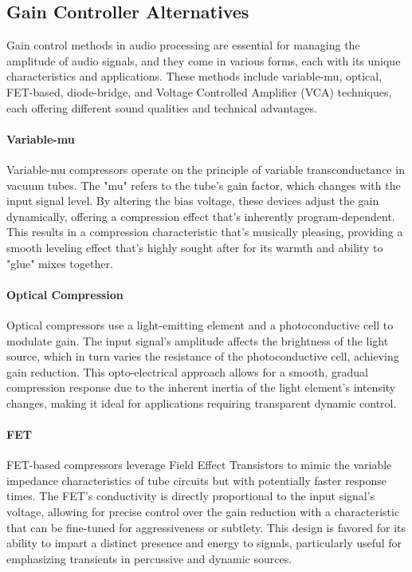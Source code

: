 \documentclass[10pt]{article}
\begin{document}
\begin{multicols*}{2}
            \subsection{Gain Controller Alternatives}\label{sect:vca}
                Gain control methods in audio processing are essential for managing the amplitude of audio signals, and they come in various forms, each with its unique characteristics and applications. These methods include variable-mu, optical, FET-based, diode-bridge, and Voltage Controlled Amplifier (VCA) techniques, each offering different sound qualities and technical advantages.

                \paragraph{Variable-mu}
                    Variable-mu compressors operate on the principle of variable transconductance in vacuum tubes. The "mu" refers to the tube's gain factor, which changes with the input signal level. By altering the bias voltage, these devices adjust the gain dynamically, offering a compression effect that's inherently program-dependent. This results in a compression characteristic that's musically pleasing, providing a smooth leveling effect that's highly sought after for its warmth and ability to "glue" mixes together.

                \paragraph{Optical Compression}
                    Optical compressors use a light-emitting element and a photoconductive cell to modulate gain. The input signal's amplitude affects the brightness of the light source, which in turn varies the resistance of the photoconductive cell, achieving gain reduction. This opto-electrical approach allows for a smooth, gradual compression response due to the inherent inertia of the light element's intensity changes, making it ideal for applications requiring transparent dynamic control.

                \paragraph{FET}
                    FET-based compressors leverage Field Effect Transistors to mimic the variable impedance characteristics of tube circuits but with potentially faster response times. The FET's conductivity is directly proportional to the input signal's voltage, allowing for precise control over the gain reduction with a characteristic that can be fine-tuned for aggressiveness or subtlety. This design is favored for its ability to impart a distinct presence and energy to signals, particularly useful for emphasizing transients in percussive and dynamic sources.
                

\end{multicols*}
\end{document}
